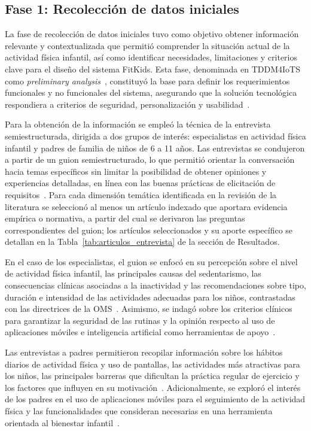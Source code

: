			\subsection{Fase 1: Recolección de datos iniciales}
				La fase de recolección de datos iniciales tuvo como objetivo obtener información relevante y contextualizada que permitió comprender la situación actual de la actividad física infantil, así como identificar necesidades, limitaciones y criterios clave para el diseño del sistema FitKids. Esta fase, denominada en TDDM4IoTS como \textit{preliminary analysis}~\cite{GuerreroUlloa2024}, constituyó la base para definir los requerimientos funcionales y no funcionales del sistema, asegurando que la solución tecnológica respondiera a criterios de seguridad, personalización y usabilidad~\cite{Hourcade2015}.
					
				Para la obtención de la información se empleó la técnica de la entrevista semiestructurada, dirigida a dos grupos de interés: especialistas en actividad física infantil y padres de familia de niños de 6 a 11 años. Las entrevistas se condujeron a partir de un guion semiestructurado, lo que permitió orientar la conversación hacia temas específicos sin limitar la posibilidad de obtener opiniones y experiencias detalladas, en línea con las buenas prácticas de elicitación de requisitos~\cite{HernandezSampieri2014,Creswell2018}. Para cada dimensión temática identificada en la revisión de la literatura se seleccionó al menos un artículo indexado que aportara evidencia empírica o normativa, a partir del cual se derivaron las preguntas correspondientes del guion; los artículos seleccionados y su aporte específico se detallan en la Tabla~\ref{tab:articulos_entrevista} de la sección de Resultados.
				
				En el caso de los especialistas, el guion se enfocó en su percepción sobre el nivel de actividad física infantil, las principales causas del sedentarismo, las consecuencias clínicas asociadas a la inactividad y las recomendaciones sobre tipo, duración e intensidad de las actividades adecuadas para los niños, contrastadas con las directrices de la OMS~\cite{Bull2020}. Asimismo, se indagó sobre los criterios clínicos para garantizar la seguridad de las rutinas y la opinión respecto al uso de aplicaciones móviles e inteligencia artificial como herramientas de apoyo~\cite{Yim2024,Direito2017}.
				
				Las entrevistas a padres permitieron recopilar información sobre los hábitos diarios de actividad física y uso de pantallas, las actividades más atractivas para los niños, las principales barreras que dificultan la práctica regular de ejercicio y los factores que influyen en su motivación~\cite{VegaDiaz2023,Yao2015}. Adicionalmente, se exploró el interés de los padres en el uso de aplicaciones móviles para el seguimiento de la actividad física y las funcionalidades que consideran necesarias en una herramienta orientada al bienestar infantil~\cite{Schoeppe2017}.
				
